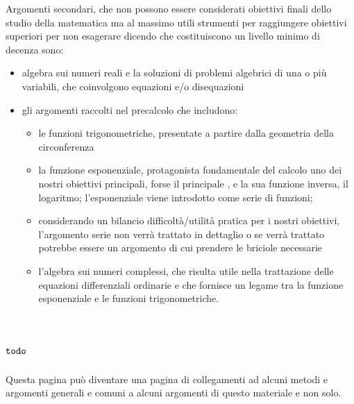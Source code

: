 \documentclass[letterpaper,10pt,italian]{jupyterBook}
\begin{document}
\sphinxAtStartPar
Argomenti secondari, che non possono essere considerati obiettivi finali dello studio della matematica ma al massimo utili strumenti per raggiungere obiettivi superiori \sphinxhyphen{} per non esagerare dicendo che costituiscono un livello minimo di decenza \sphinxhyphen{} sono:
\begin{itemize}
\item {} 
\sphinxAtStartPar
algebra sui numeri reali e la soluzioni di problemi algebrici di una o più variabili, che coinvolgono equazioni e/o disequazioni

\item {} 
\sphinxAtStartPar
gli argomenti raccolti nel precalcolo che includono:
\begin{itemize}
\item {} 
\sphinxAtStartPar
le funzioni trigonometriche, presentate a partire dalla geometria della circonferenza

\item {} 
\sphinxAtStartPar
la funzione esponenziale, protagonista fondamentale del calcolo \sphinxhyphen{} uno dei nostri obiettivi principali, forse il principale \sphinxhyphen{}, e la sua funzione inversa, il logaritmo; l’esponenziale viene introdotto come serie di funzioni;

\item {} 
\sphinxAtStartPar
considerando un bilancio difficoltà/utilità pratica per i nostri obiettivi, l’argomento serie non verrà trattato in dettaglio \sphinxhyphen{} o se verrà trattato potrebbe essere un argomento di cui prendere le briciole necessarie

\item {} 
\sphinxAtStartPar
l’algebra sui numeri complessi, che risulta utile nella trattazione delle equazioni differenziali ordinarie e che fornisce un legame tra la funzione esponenziale e le funzioni trigonometriche.

\end{itemize}

\end{itemize}





\sphinxstepscope


\chapter{\protect\(\texttt{todo}\protect\)}
\label{\detokenize{ch/todo:texttt-todo}}\label{\detokenize{ch/todo:math-hs-todo}}\label{\detokenize{ch/todo::doc}}
\sphinxAtStartPar
Questa pagina può diventare una pagina di collegamenti ad alcuni metodi e argomenti generali e comuni a alcuni argomenti di questo materiale e non solo.
\end{document}
